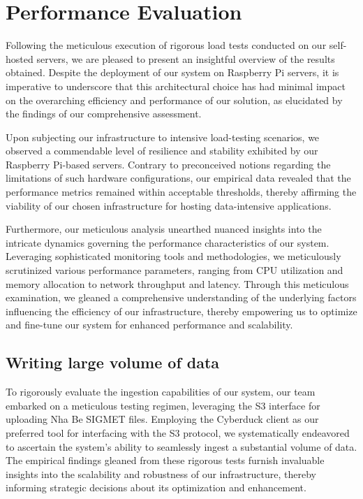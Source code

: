 \section{Performance Evaluation}
Following the meticulous execution of rigorous load tests conducted on our
self-hosted servers, we are pleased to present an insightful overview of the
results obtained. Despite the deployment of our system on Raspberry Pi servers,
it is imperative to underscore that this architectural choice has had minimal
impact on the overarching efficiency and performance of our solution, as
elucidated by the findings of our comprehensive assessment.

Upon subjecting our infrastructure to intensive load-testing scenarios, we
observed a commendable level of resilience and stability exhibited by our
Raspberry Pi-based servers. Contrary to preconceived notions regarding the
limitations of such hardware configurations, our empirical data revealed that
the performance metrics remained within acceptable thresholds, thereby affirming
the viability of our chosen infrastructure for hosting data-intensive
applications.

Furthermore, our meticulous analysis unearthed nuanced insights into the
intricate dynamics governing the performance characteristics of our system.
Leveraging sophisticated monitoring tools and methodologies, we meticulously
scrutinized various performance parameters, ranging from CPU utilization and
memory allocation to network throughput and latency. Through this meticulous
examination, we gleaned a comprehensive understanding of the underlying factors
influencing the efficiency of our infrastructure, thereby empowering us to
optimize and fine-tune our system for enhanced performance and scalability.

\subsection{Writing large volume of data}

To rigorously evaluate the ingestion capabilities of our system, our team
embarked on a meticulous testing regimen, leveraging the S3 interface for
uploading Nha Be SIGMET files. Employing the Cyberduck client as our preferred
tool for interfacing with the S3 protocol, we systematically endeavored to
ascertain the system's ability to seamlessly ingest a substantial volume of
data. The empirical findings gleaned from these rigorous tests furnish
invaluable insights into the scalability and robustness of our infrastructure,
thereby informing strategic decisions about its optimization and enhancement.

